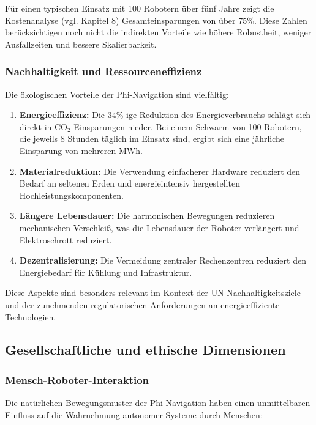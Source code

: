 ﻿\documentclass[a4paper,12pt]{article}
\theoremstyle{definition}
\begin{document}
Für einen typischen Einsatz mit 100 Robotern über fünf Jahre zeigt die Kostenanalyse (vgl. Kapitel 8) Gesamteinsparungen von über 75\%. Diese Zahlen berücksichtigen noch nicht die indirekten Vorteile wie höhere Robustheit, weniger Ausfallzeiten und bessere Skalierbarkeit.

\subsubsection{Nachhaltigkeit und Ressourceneffizienz}

Die ökologischen Vorteile der Phi-Navigation sind vielfältig:

\begin{enumerate}
	\item \textbf{Energieeffizienz:} Die 34\%-ige Reduktion des Energieverbrauchs schlägt sich direkt in CO$_2$-Einsparungen nieder. Bei einem Schwarm von 100 Robotern, die jeweils 8 Stunden täglich im Einsatz sind, ergibt sich eine jährliche Einsparung von mehreren MWh.
	
	\item \textbf{Materialreduktion:} Die Verwendung einfacherer Hardware reduziert den Bedarf an seltenen Erden und energieintensiv hergestellten Hochleistungskomponenten.
	
	\item \textbf{Längere Lebensdauer:} Die harmonischen Bewegungen reduzieren mechanischen Verschleiß, was die Lebensdauer der Roboter verlängert und Elektroschrott reduziert.
	
	\item \textbf{Dezentralisierung:} Die Vermeidung zentraler Rechenzentren reduziert den Energiebedarf für Kühlung und Infrastruktur.
\end{enumerate}

Diese Aspekte sind besonders relevant im Kontext der UN-Nachhaltigkeitsziele und der zunehmenden regulatorischen Anforderungen an energieeffiziente Technologien.

\subsection{Gesellschaftliche und ethische Dimensionen}

\subsubsection{Mensch-Roboter-Interaktion}

Die natürlichen Bewegungsmuster der Phi-Navigation haben einen unmittelbaren Einfluss auf die Wahrnehmung autonomer Systeme durch Menschen:
\end{document}
